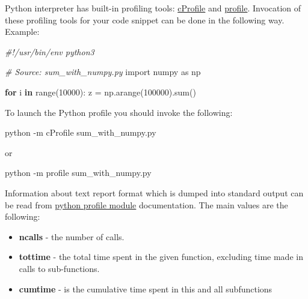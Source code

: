 \documentclass[
]{article}
\newenvironment{Shaded}{}{}
\newcommand{\AttributeTok}[1]{\textcolor[rgb]{0.49,0.56,0.16}{#1}}
\newcommand{\BuiltInTok}[1]{#1}
\newcommand{\CommentTok}[1]{\textcolor[rgb]{0.38,0.63,0.69}{\textit{#1}}}
\newcommand{\ControlFlowTok}[1]{\textcolor[rgb]{0.00,0.44,0.13}{\textbf{#1}}}
\newcommand{\DecValTok}[1]{\textcolor[rgb]{0.25,0.63,0.44}{#1}}
\newcommand{\ExtensionTok}[1]{#1}
\newcommand{\ImportTok}[1]{#1}
\newcommand{\KeywordTok}[1]{\textcolor[rgb]{0.00,0.44,0.13}{\textbf{#1}}}
\newcommand{\NormalTok}[1]{#1}
\newcommand{\OperatorTok}[1]{\textcolor[rgb]{0.40,0.40,0.40}{#1}}
\begin{document}
Python interpreter has built-in profiling tools:
\href{https://docs.python.org/3/library/profile.html\#module-cProfile}{cProfile}
and
\href{https://docs.python.org/3/library/profile.html\#module-profile}{profile}.
Invocation of these profiling tools for your code snippet can be done in
the following way. Example:

\begin{Shaded}
\begin{Highlighting}[]
\CommentTok{\#!/usr/bin/env python3}

\CommentTok{\# Source: sum\_with\_numpy.py}
\ImportTok{import}\NormalTok{ numpy }\ImportTok{as}\NormalTok{ np}

\ControlFlowTok{for}\NormalTok{ i }\KeywordTok{in} \BuiltInTok{range}\NormalTok{(}\DecValTok{10000}\NormalTok{):}
\NormalTok{    z }\OperatorTok{=}\NormalTok{ np.arange(}\DecValTok{100000}\NormalTok{).}\BuiltInTok{sum}\NormalTok{()}
\end{Highlighting}
\end{Shaded}

To launch the Python profile you should invoke the following:

\begin{Shaded}
\begin{Highlighting}[]
\ExtensionTok{python} \AttributeTok{{-}m}\NormalTok{ cProfile sum\_with\_numpy.py }
\end{Highlighting}
\end{Shaded}

or

\begin{Shaded}
\begin{Highlighting}[]
\ExtensionTok{python} \AttributeTok{{-}m}\NormalTok{ profile sum\_with\_numpy.py }
\end{Highlighting}
\end{Shaded}

Information about text report format which is dumped into standard
output can be read from
\href{https://docs.python.org/3/library/profile.html\#module-profile}{python
profile module} documentation. The main values are the following:

\begin{itemize}
\item
  \textbf{ncalls} - the number of calls.
\item
  \textbf{tottime} - the total time spent in the given function,
  excluding time made in calls to sub-functions.
\item
  \textbf{cumtime} - is the cumulative time spent in this and all
  subfunctions
\end{itemize}
\end{document}
